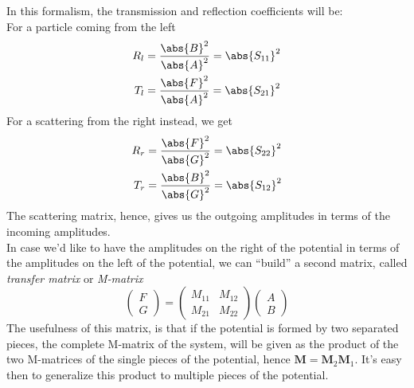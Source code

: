 \documentclass[a4paper, 11pt]{book}
\renewcommand{\vec}[1]{\mathbf{#1}}
\newcommand{\1}{\opr{\mathds{1}}}
\theoremstyle{plain}
\begin{document}
	In this formalism, the transmission and reflection coefficients will be:\\
	For a particle coming from the left
	\begin{equation}
		\begin{aligned}
			R_l&=\frac{\abs{B}^2}{\abs{A}^2}=\abs{S_{11}}^2\\
			T_l&=\frac{\abs{F}^2}{\abs{A}^2}=\abs{S_{21}}^2
		\end{aligned}
		\label{eq:scatteringleftsm}
	\end{equation}
	For a scattering from the right instead, we get
	\begin{equation}
		\begin{aligned}
			R_r&=\frac{\abs{F}^2}{\abs{G}^2}=\abs{S_{22}}^2\\
			T_r&=\frac{\abs{B}^2}{\abs{G}^2}=\abs{S_{12}}^2
		\end{aligned}
		\label{eq:scatteringrightsm}
	\end{equation}
	The scattering matrix, hence, gives us the outgoing amplitudes in terms of the incoming amplitudes.\\
	In case we'd like to have the amplitudes on the right of the potential in terms of the amplitudes on the left of the potential, we can ``build'' a second matrix, called \textit{transfer matrix} or \textit{M-matrix}
	\begin{equation}
		\begin{pmatrix}
			F\\
			G
		\end{pmatrix}=\begin{pmatrix}
			M_{11}&M_{12}\\
			M_{21}&M_{22}
		\end{pmatrix}\begin{pmatrix}
			A\\
			B
		\end{pmatrix}
		\label{eq:mmatrix}
	\end{equation}
	The usefulness of this matrix, is that if the potential is formed by two separated pieces, the complete M-matrix of the system, will be given as the product of the two M-matrices of the single pieces of the potential, hence $\vec{M}=\vec{M}_2\vec{M}_1$. It's easy then to generalize this product to multiple pieces of the potential.
\end{document}
